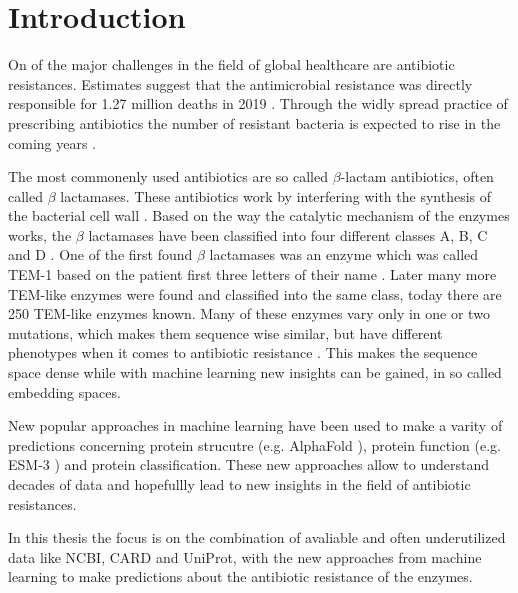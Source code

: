 \chapter{Introduction}

On of the major challenges in the field of global healthcare are antibiotic resistances. Estimates suggest that the antimicrobial resistance was directly responsible for 1.27 million deaths in 2019 \cite{who_antibiotic_resistance}. Through the widly spread practice of prescribing antibiotics the number of resistant bacteria is expected to rise in the coming years \cite{versporten2018}.

The most commonenly used antibiotics are so called $\beta$-lactam antibiotics, often called $\beta$ lactamases. These antibiotics work by interfering with the synthesis of the bacterial cell wall \cite{waxman1980}. Based on the way the catalytic mechanism of the enzymes works, the $\beta$ lactamases have been classified into four different classes A, B, C and D \cite{bush2013}. One of the first found $\beta$ lactamases was an enzyme which was called TEM-1 based on the patient first three letters of their name \cite{sutcliffe1978}. Later many more TEM-like enzymes were found and classified into the same class, today there are 250 TEM-like enzymes known. Many of these enzymes vary only in one or two mutations, which makes them sequence wise similar, but have different phenotypes when it comes to antibiotic resistance \cite{naas2017}. This makes the sequence space dense while with machine learning new insights can be gained, in so called embedding spaces.

New popular approaches in machine learning have been used to make a varity of predictions concerning protein strucutre (e.g. AlphaFold \cite{jumper2021}), protein function (e.g. ESM-3 \cite{hayes2025}) and protein classification. These new approaches allow to understand decades of data and hopefullly lead to new insights in the field of antibiotic resistances.

In this thesis the focus is on the combination of avaliable and often underutilized data like NCBI, CARD and UniProt, with the new approaches from machine learning to make predictions about the antibiotic resistance of the enzymes.